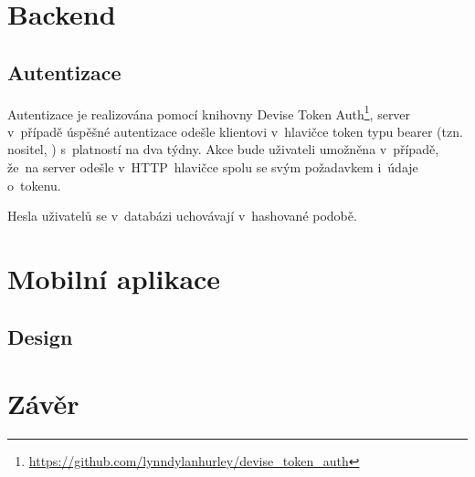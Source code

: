 \documentclass[twoside]{ctuthesis}
\begin{document}

%
%
% 
%
% 



\chapter{Backend}


\section{Autentizace}
Autentizace je realizována pomocí knihovny Devise Token Auth\footnote{\url{https://github.com/lynndylanhurley/devise_token_auth}}, server v~případě úspěšné autentizace odešle klientovi v~hlavičce token typu bearer (tzn. nositel,  \cite{swagger2020bearer}) s~platností na dva týdny. Akce bude uživateli umožněna v~případě, že~na server odešle v~HTTP~hlavičce spolu se svým požadavkem i~údaje o~tokenu.

Hesla uživatelů se v~databázi uchovávají v~hashované podobě.



\chapter{Mobilní aplikace}


\section{Design}



\chapter{Závěr}

\printbibliography[title={Seznam použité literatury}]
\end{document}
